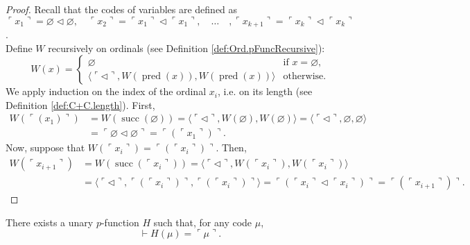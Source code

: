 \begin{proof}
    Recall that the codes of variables are defined as 
    $\ulcorner{x_1}\urcorner = \varnothing \lhd \varnothing, \quad 
    \ulcorner{x_2}\urcorner = \ulcorner{x_1}\urcorner \lhd \ulcorner{x_1}\urcorner,\quad\ldots\quad,
    \ulcorner{x_{k+1}}\urcorner = \ulcorner{x_k}\urcorner \lhd \ulcorner{x_k}\urcorner$.\\
    Define $W$ recursively on ordinals (see Definition \ref{def:Ord.pFuncRecursive}):
    $$
    W(x) = \begin{cases}
        \varnothing & \text{if } x = \varnothing, \\
        \langle \ulcorner{\lhd}\urcorner, W(\operatorname{pred}(x)), W(\operatorname{pred}(x)) 
        \rangle & \text{otherwise}.
    \end{cases}
    $$ 
    We apply induction on the index of the ordinal $x_i$, i.e. on its length 
    (see Definition \ref{def:C+C.length}).
    First,
    \begin{equation*}
        \begin{split}
    W(\ulcorner(x_1)\urcorner) &= W(\operatorname{succ}(\varnothing)) =
    \langle \ulcorner{\lhd}\urcorner, W(\varnothing), W(\varnothing) \rangle =
    \langle \ulcorner{\lhd}\urcorner, \varnothing, \varnothing \rangle \\ & = 
    \ulcorner{\varnothing \lhd \varnothing}\urcorner = 
    \ulcorner{(\ulcorner{x_1}\urcorner)}\urcorner.
    \end{split}
    \end{equation*}
    Now, suppose that $W(\ulcorner{x_i}\urcorner) = \ulcorner{(\ulcorner{x_i}\urcorner)}\urcorner$.
    Then,
    \begin{equation*}
        \begin{split}
    W(\ulcorner{x_{i+1}}\urcorner) & = W(\operatorname{succ}(\ulcorner{x_i}\urcorner)) =
    \langle \ulcorner{\lhd}\urcorner, W(\ulcorner{x_i}\urcorner), W(\ulcorner{x_i}\urcorner) \rangle
    \\ & = \langle \ulcorner{\lhd}\urcorner, \ulcorner{(\ulcorner{x_i}\urcorner)}\urcorner,
    \ulcorner{(\ulcorner{x_i}\urcorner)}\urcorner \rangle 
    = \ulcorner{(\ulcorner{x_i}\urcorner \lhd \ulcorner{x_i}\urcorner)}\urcorner =
    \ulcorner{(\ulcorner{x_{i+1}}\urcorner)}\urcorner.
        \end{split}
    \end{equation*}
\end{proof}

\begin{lemma}
    \label{lem:Code.exists_pFunc_eq_code}
    There exists a unary $p$-function $H$ such that, for any code $\mu$,
    $$
    \vdash H(\mu) = \ulcorner{\mu}\urcorner.
    $$
\end{lemma}

